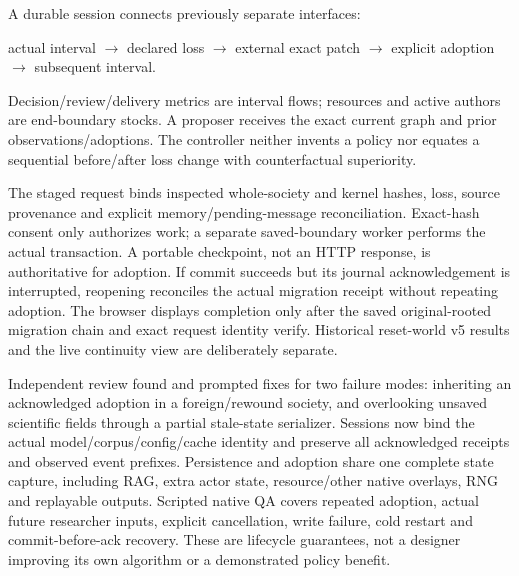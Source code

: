 A durable session connects previously separate interfaces:
\begin{center}
\small
actual interval $\to$ declared loss $\to$ external exact patch
$\to$ explicit adoption $\to$ subsequent interval.
\end{center}
Decision/review/delivery metrics are interval flows; resources and active authors
are end-boundary stocks. A proposer receives the exact current graph and prior
observations/adoptions. The controller neither invents a policy nor equates a
sequential before/after loss change with counterfactual superiority.

The staged request binds inspected whole-society and kernel hashes, loss, source
provenance and explicit memory/pending-message reconciliation. Exact-hash consent
only authorizes work; a separate saved-boundary worker performs the actual
transaction. A portable checkpoint, not an HTTP response, is authoritative for
adoption. If commit succeeds but its journal acknowledgement is interrupted,
reopening reconciles the actual migration receipt without repeating adoption.
The browser displays completion only after the saved original-rooted migration
chain and exact request identity verify. Historical reset-world v5 results and
the live continuity view are deliberately separate.

Independent review found and prompted fixes for two failure modes: inheriting
an acknowledged adoption in a foreign/rewound society, and overlooking unsaved
scientific fields through a partial stale-state serializer. Sessions now bind
the actual model/corpus/config/cache identity and preserve all acknowledged
receipts and observed event prefixes. Persistence and adoption share one complete
state capture, including RAG, extra actor state, resource/other native overlays,
RNG and replayable outputs. Scripted native QA covers repeated adoption, actual
future researcher inputs, explicit cancellation, write failure, cold restart
and commit-before-ack recovery. These are lifecycle guarantees, not a designer
improving its own algorithm or a demonstrated policy benefit.

